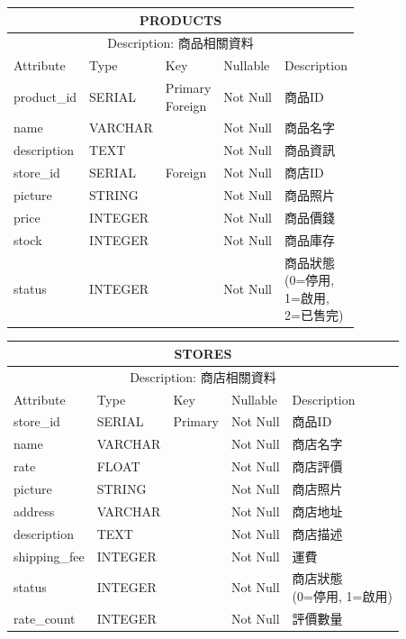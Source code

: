 \documentclass[a4paper, 12pt]{article}
\begin{document}
\noindent\begin{tabular}{ | p{7em} | p{5.5em} | p{5.5em} | p{4.5em} | p{11em} |}
  \hline
  \multicolumn{5}{|c|}{PRODUCTS} \tabularnewline
  \hline 
  \multicolumn{5}{|c|}{Description: 商品相關資料} \tabularnewline
  \hline 
  Attribute & Type & Key & Nullable & Description \\
  \hline
  product_id& SERIAL & \makecell[l]{Primary \\ Foreign}  & Not Null & 商品ID \\
  \hline
  name & VARCHAR & &Not Null &商品名字\\
  \hline
  description & TEXT & &Not Null &商品資訊\\
  \hline
  store_id & SERIAL &Foreign &Not Null &商店ID\\
  \hline
  picture & STRING & &Not Null &商品照片\\
  \hline
  price & INTEGER & &Not Null &商品價錢\\
  \hline
  stock & INTEGER &  &Not Null &商品庫存\\
  \hline
  status & INTEGER &  &Not Null &\makecell[l]{商品狀態\\(0=停用,\\ 1=啟用,\\ 2=已售完)}\\
  \hline
\end{tabular}
\vspace{1em}

\noindent\begin{tabular}{ | p{7em} | p{5.5em} | p{5.5em} | p{4.5em} | p{11em} |}
  \hline
  \multicolumn{5}{|c|}{STORES} \tabularnewline
  \hline 
  \multicolumn{5}{|c|}{Description: 商店相關資料} \tabularnewline
  \hline 
  Attribute & Type & Key & Nullable & Description \\
  \hline
  store_id& SERIAL & Primary & Not Null & 商品ID \\
  \hline
  name & VARCHAR & &Not Null &商店名字\\
  \hline
  rate & FLOAT & &Not Null &商店評價\\
  \hline
  picture & STRING & &Not Null &商店照片\\
  \hline
  address & VARCHAR & &Not Null &商店地址\\
  \hline
  description & TEXT & &Not Null &商店描述\\
  \hline
  shipping_fee & INTEGER & &Not Null &運費\\
  \hline
  status & INTEGER & &Not Null &\makecell[l]{商店狀態\\(0=停用, 1=啟用)}\\
  \hline
  rate_count & INTEGER & &Not Null &評價數量\\
  \hline
\end{tabular}
\vspace{1em}
\end{document}
